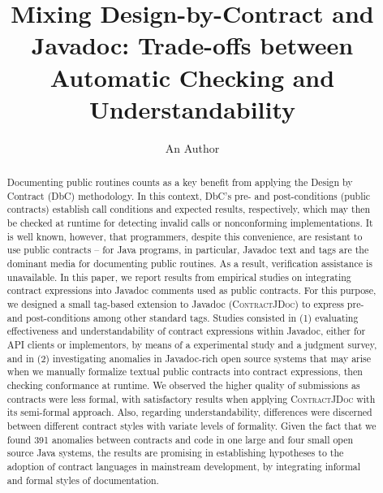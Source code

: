 \documentclass[a4paper,UKenglish]{lipics-v2018}
\title{Mixing Design-by-Contract and Javadoc: Trade-offs between Automatic Checking and Understandability}
\author{An Author}{An Institution}{author@authors.com}{}{}
\newcommand{\contractjdoc}[1]{\textsc{ContractJDoc}}
\begin{document}
\maketitle

\begin{abstract}
Documenting public routines counts as a key benefit from applying the Design by Contract (DbC) methodology. 
In this context, DbC's pre- and post-conditions (public contracts) establish call conditions and expected results, respectively, which may then be checked at runtime for detecting invalid calls or nonconforming implementations.
%
It is well known, however, that programmers, despite this convenience, are resistant to use public contracts -- for Java programs, in particular, Javadoc text and tags are the dominant media for documenting public routines.
As a result, verification assistance is unavailable.
%
In this paper, we report results from empirical studies on integrating contract expressions into Javadoc comments used as public contracts. 
For this purpose, we designed a small tag-based extension to Javadoc (\contractjdoc{}) to express pre- and post-conditions among other standard tags.
%
Studies consisted in (1) evaluating effectiveness and understandability of contract expressions within Javadoc, either for API clients or implementors, by means of a experimental study and a judgment survey, and in (2) investigating anomalies in Javadoc-rich open source systems that may arise when we manually formalize textual public contracts into contract expressions, then checking conformance at runtime.
%
We observed the higher quality of submissions as contracts were less formal, with satisfactory results when applying \contractjdoc{} with its semi-formal approach. Also, regarding understandability, differences were discerned between different contract styles with variate levels of formality.
Given the fact that we found 391 anomalies between contracts and code in one large and four small open source Java systems, the results are promising in establishing hypotheses to the adoption of contract languages in mainstream development, by integrating informal and formal styles of documentation.
\end{abstract}














\end{document}
